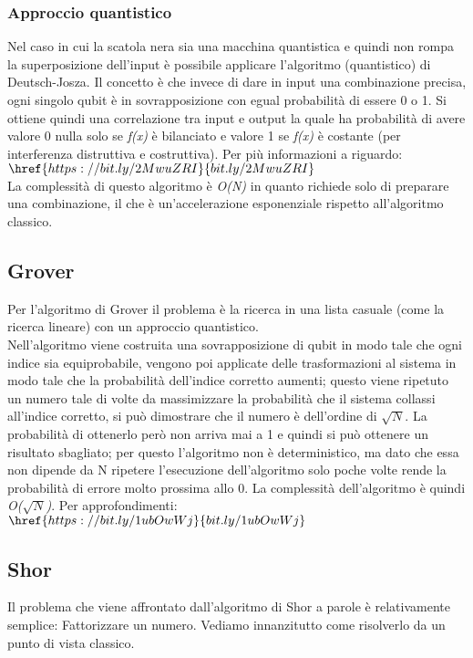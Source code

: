 \subsubsection{Approccio quantistico}
Nel caso in cui la scatola nera sia una macchina quantistica e quindi non rompa la superposizione dell'input è possibile applicare l'algoritmo (quantistico) di Deutsch-Josza. Il concetto è che invece di dare in input una combinazione precisa, ogni singolo qubit è in sovrapposizione con egual probabilità di essere 0 o 1. Si ottiene quindi una correlazione tra input e output la quale ha probabilità di avere valore 0 nulla solo se \textit{f(x)} è bilanciato e valore 1 se \textit{f(x)} è costante (per interferenza distruttiva e costruttiva).
Per più informazioni a riguardo:\\
$\href{https://bit.ly/2MwuZRI}{bit.ly/2MwuZRI}$\\
La complessità di questo algoritmo è \textit{O(N)} in quanto richiede solo di preparare una combinazione, il che è un'accelerazione esponenziale rispetto all'algoritmo classico.
\subsection{Grover}
Per l'algoritmo di Grover il problema è la ricerca in una lista casuale (come la ricerca lineare) con un approccio quantistico.\\
Nell'algoritmo viene costruita una sovrapposizione di qubit in modo tale che ogni indice sia equiprobabile, vengono poi applicate delle trasformazioni al sistema in modo tale che la probabilità dell'indice corretto aumenti; questo viene ripetuto un numero tale di volte da massimizzare la probabilità che il sistema collassi all'indice corretto, si può dimostrare che il numero è dell'ordine di $\sqrt{N}$.
La probabilità di ottenerlo però non arriva mai a 1 e quindi si può ottenere un risultato sbagliato; per questo l'algoritmo non è deterministico, ma dato che essa non dipende da N ripetere l'esecuzione dell'algoritmo solo poche volte rende la probabilità di errore molto prossima allo  0. La complessità dell'algoritmo è quindi \textit{O($\sqrt{N}$)}.
Per approfondimenti:\\
$\href{https://bit.ly/1ubOwWj}{bit.ly/1ubOwWj}$
\subsection{Shor}
Il problema che viene affrontato dall'algoritmo di Shor a parole è relativamente semplice: Fattorizzare un numero. Vediamo innanzitutto come risolverlo da un punto di vista classico.
